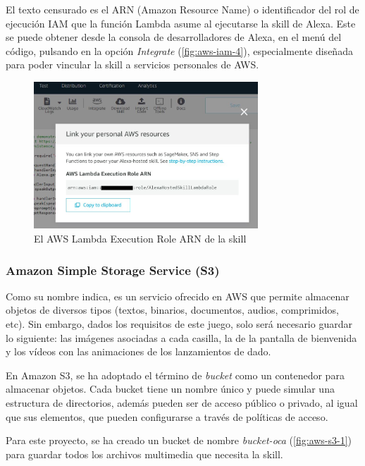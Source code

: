 El texto censurado es el ARN (Amazon Resource Name) o identificador del rol de ejecución IAM que la función Lambda asume al ejecutarse la skill de Alexa. Este se puede obtener desde la consola de desarrolladores de Alexa, en el menú del código, pulsando en la opción \textit{Integrate} (\autoref{fig:aws-iam-4}), especialmente diseñada para poder vincular la skill a servicios personales de AWS.

\begin{figure}[H]
	\centering
	\includegraphics[width=0.75\textwidth]{imgs/aws-iam-4.png}
	\caption{El AWS Lambda Execution Role ARN de la skill}
	\label{fig:aws-iam-4}
\end{figure}

\subsubsection{Amazon Simple Storage Service (S3)}

Como su nombre indica, es un servicio ofrecido en AWS que permite almacenar objetos de diversos tipos (textos, binarios, documentos, audios, comprimidos, etc). Sin embargo, dados los requisitos de este juego, solo será necesario guardar lo siguiente: las imágenes asociadas a cada casilla, la de la pantalla de bienvenida y los vídeos con las animaciones de los lanzamientos de dado.

En Amazon S3, se ha adoptado el término de \textit{bucket} como un contenedor para almacenar objetos. Cada bucket tiene un nombre único y puede simular una estructura de directorios, además pueden ser de acceso público o privado, al igual que sus elementos, que pueden configurarse a través de políticas de acceso.

Para este proyecto, se ha creado un bucket de nombre \textit{bucket-oca} (\autoref{fig:aws-s3-1}) para guardar todos los archivos multimedia que necesita la skill.

